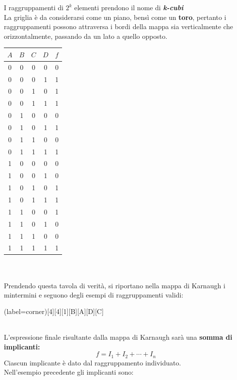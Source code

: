 \documentclass[12pt]{report}
\begin{document}
				I raggruppamenti di $2^k$ elementi prendono il nome di \textbf{\textit{k-cubi}} \\
				La griglia è da considerarsi come un piano, bensì come un \textbf{toro}, pertanto i raggruppamenti possono attraversa i bordi della mappa sia verticalmente che orizzontalmente, passando da un lato a quello opposto. \\

				\begin{tabular}{c|c|c|c|c}
					$A$ & $B$ & $C$ & $D$ & $f$ \\
					\hline
					0 & 0 & 0 & 0 & 0 \\
					0 & 0 & 0 & 1 & 1 \\
					0 & 0 & 1 & 0 & 1 \\
					0 & 0 & 1 & 1 & 1 \\
					0 & 1 & 0 & 0 & 0 \\
					0 & 1 & 0 & 1 & 1 \\
					0 & 1 & 1 & 0 & 0 \\
					0 & 1 & 1 & 1 & 1 \\
					1 & 0 & 0 & 0 & 0 \\
					1 & 0 & 0 & 1 & 0 \\
					1 & 0 & 1 & 0 & 1 \\
					1 & 0 & 1 & 1 & 1 \\
					1 & 1 & 0 & 0 & 1 \\
					1 & 1 & 0 & 1 & 0 \\
					1 & 1 & 1 & 0 & 0 \\
					1 & 1 & 1 & 1 & 1 \\
				\end{tabular} \\ \\
				Prendendo questa tavola di verità, si riportano nella mappa di Karnaugh i mintermini e seguono degli esempi di raggruppamenti validi: \\
				\begin{karnaugh-map}(label=corner)[4][4][1][B][A][D][C]
				\end{karnaugh-map} \\
				L'espressione finale risultante dalla mappa di Karnaugh sarà una \textbf{somma di implicanti:}
				\[
				f = I_1 + I_2 + \cdots + I_n
				\]
				Ciascun implicante è dato dal raggruppamento individuato. \\
				Nell'esempio precedente gli implicanti sono: \\
\end{document}
